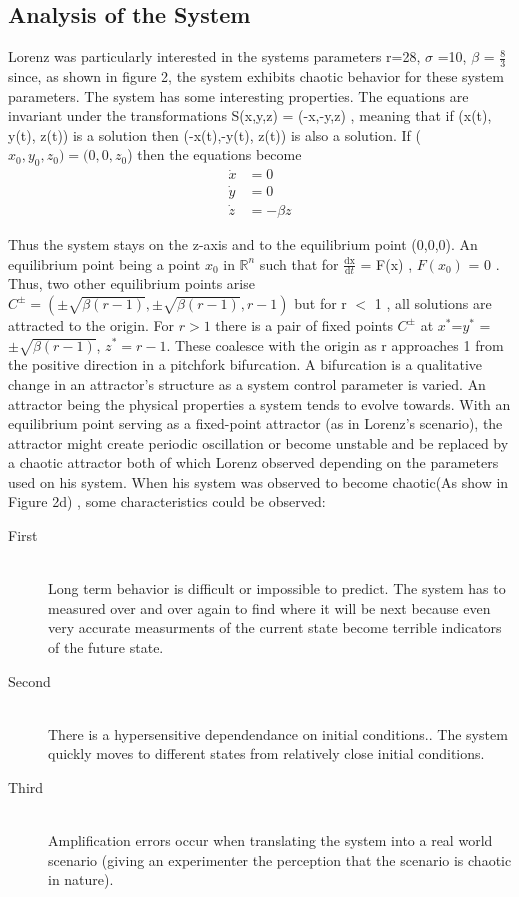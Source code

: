 \documentclass[letterpaper,titlepage,10pt]{article}
\begin{document}
\subsection{Analysis of the System}
{\parindent0pt
Lorenz was particularly interested in the systems parameters r=28, $\sigma$ =10, $\beta$ = $\frac{8}{3}$ since, as shown in figure 2, the system exhibits chaotic behavior for these system parameters. The system has some interesting properties. The equations are invariant under the transformations S(x,y,z) = (-x,-y,z) \cite{b}, meaning that if (x(t), y(t), z(t)) is a solution then (-x(t),-y(t), z(t)) is also a solution.  If ($x_{0},y_{0},z_{0}) = (0,0,z_{0}$) then the equations become 
\begin{align*}
\dot{x} &= 0 \\
\dot{y} &= 0 \\
\dot{z} &= -\beta z
\end{align*}

Thus the system stays on the z-axis and to the equilibrium point (0,0,0). An equilibrium point being a point $x_{0}$ in $\mathbb{R}^{n}$ such that for $\frac{\text{dx}}{\text{d}t}$ = F(x) , $F(x_{0})$ = 0 \cite{g}. Thus, two other equilibrium points arise $C^{\pm} = (\pm\sqrt{\beta (r-1)}, \pm\sqrt{\beta (r-1)}, r-1) $ but for r $<$ 1 , all solutions are attracted to the origin. For $r>1$  there is a pair of fixed points $C^{\pm}$ at $x^{*}$=$y^{*}$ = $\pm\sqrt{\beta (r-1)}$, $z^{*}= r-1$. These coalesce with the origin as r approaches 1 from the positive direction in a pitchfork bifurcation. \cite{b} \newline \newline 
A bifurcation is a qualitative change in an attractor's structure as a system control parameter is varied. \cite{h} An attractor being the physical properties a system tends to evolve towards. \cite{h} With an equilibrium point serving as a fixed-point attractor (as in Lorenz's scenario), the attractor might create periodic oscillation  or  become unstable and be replaced by a chaotic attractor both of which Lorenz observed depending on the parameters used on his system. When his system was observed to become chaotic(As show in Figure 2d) \cite{b}, some characteristics could be observed:

\begin{description}
  \item[First] \hfill \\
  Long term behavior is difficult or impossible to predict. The system has to measured over and over again to find where it will be next because even very accurate measurments of the current state become terrible indicators of the future state. 
  \item[Second] \hfill \\
  There is a hypersensitive dependendance on initial conditions.. The system quickly moves to different states from relatively close initial conditions.
  \item[Third] \hfill \\
  Amplification errors occur when translating the system into a real world scenario (giving an experimenter the perception that the scenario is chaotic in nature).
\end{description}

}
\end{document}
